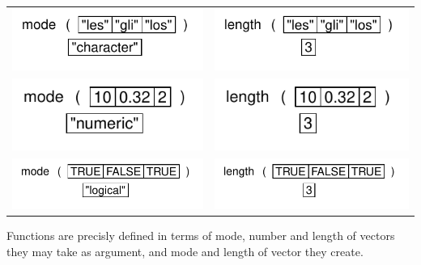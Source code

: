 \documentclass[pdflatex]{article}
\begin{document}
\begin{tabular}{cc}
\includegraphics{v_char_type} & \includegraphics{v_char_length}\\
\includegraphics{v_num_type} & \includegraphics{v_num_length}\\
\includegraphics{v_log_type} & \includegraphics{v_log_length}\\
\end{tabular}

Functions are precisly defined in terms of mode, number and length of vectors they may take as argument, and mode and length of vector they create.
\end{document}
